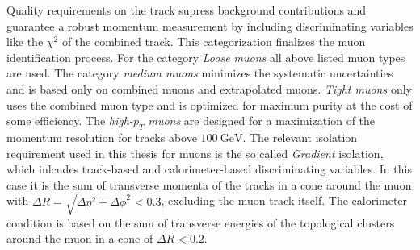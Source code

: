 Quality requirements on the track supress background contributions and guarantee a robust momentum measurement by including discriminating variables like the $\chi^2$ of the combined track. This categorization finalizes the muon identification process. For the category \textit{Loose muons} all above listed muon types are used. The category \textit{medium muons} minimizes the systematic uncertainties and is based only on combined muons and extrapolated muons. \textit{Tight muons} only uses the combined muon type and is optimized for maximum purity at the cost of some efficiency. The \textit{high-$p_T$ muons} are designed for  a maximization of the momentum resolution for tracks above $\SI{100}{\giga\electronvolt}$. \cite{muPerformance}\newline
The relevant isolation requirement used in this thesis for muons is the so called \textit{Gradient} isolation, which inlcudes track-based and calorimeter-based discriminating variables. In this case it is the sum of transverse momenta of the tracks in a cone around the muon with $\Delta R=\sqrt{\Delta\eta^2+\Delta\phi^2}<0.3$, excluding the muon track itself. The calorimeter condition is based on the sum of transverse energies of the topological clusters around the muon in a cone of $\Delta R<0.2$. \cite{muPerformance}\cite{varcone}     
%
%

